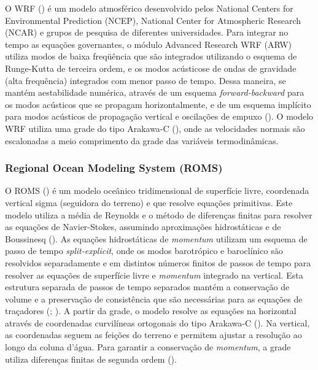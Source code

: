 \documentclass{article}
\begin{document}
O WRF (\cite{Skamarock2008}) é um modelo atmosférico desenvolvido pelos National Centers for Environmental Prediction (NCEP), 
National Center for Atmospheric Research (NCAR) e grupos de pesquisa de diferentes universidades. Para integrar 
no tempo as equações governantes, o módulo Advanced Research WRF (ARW) utiliza modos de baixa freqüência que 
são integrados utilizando o esquema de Runge-Kutta de terceira ordem, e os modos acústicose de ondas de gravidade 
(alta frequência) integrados com menor passo de tempo. Dessa maneira, se mantém aestabilidade numérica, 
através de um esquema \textit{forward-backward} para os modos acústicos que se propagam horizontalmente, e de um esquema 
implícito para modos acústicos de propagação vertical e oscilações de empuxo (\cite{Skamarock2008}). O modelo WRF 
utiliza uma grade do tipo Arakawa-C (\cite{Arakawa1977}), onde as velocidades normais são escalonadas a meio 
comprimento da grade das variáveis termodinâmicas.

\subsubsection{Regional Ocean Modeling System (ROMS)}
\bigskip

O ROMS (\cite{Shchepetkin2005}) é um modelo oceânico tridimensional de superfície livre, 
coordenada vertical sigma (seguidora do terreno) e que resolve equações primitivas. Este modelo utiliza a média de 
Reynolds e o método de diferenças finitas para resolver as equações de Navier-Stokes, assumindo aproximações hidrostáticas
e de Boussinesq (\cite{Haidvogel2008}). As equações hidrostáticas de \textit{momentum} utilizam um esquema de passo de tempo 
\textit{split-explicit}, onde os modos barotrópico e baroclínico são resolvidos separadamente e em distintos números 
finitos de passos de tempo para resolver as equações de superfície livre e \textit{momentum} integrado na vertical. 
Esta estrutura separada de passos de tempo separados mantém a conservação de volume e a preservação de consistência que são necessárias 
para as equações de traçadores (\cite{Haidvogel2008}; \cite{Shchepetkin2005}). A partir da grade, o modelo resolve 
as equações na horizontal através de coordenadas curvilíneas ortogonais do tipo Arakawa-C (\cite{Arakawa1977}). 
Na vertical, as coordenadas seguem as feições do terreno e permitem ajustar a resolução ao longo da coluna d’água. 
Para garantir a conservação de \textit{momentum}, a grade utiliza diferenças finitas de segunda ordem (\cite{Haidvogel2008}).
\end{document}
